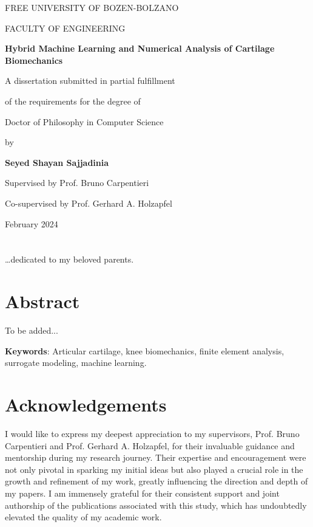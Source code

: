 \documentclass[12pt,a4paper]{report}
\begin{document}
\begin{titlepage}
    \centering
    \vspace*{1.5cm}
    \textsc{FREE UNIVERSITY OF BOZEN-BOLZANO}\par
    \textsc{FACULTY OF ENGINEERING}\par
    \vspace{2.5cm}
    {\LARGE\bfseries Hybrid Machine Learning and Numerical Analysis of Cartilage Biomechanics\par}
    \vspace{2cm}
    A dissertation submitted in partial fulfillment\par
    of the requirements for the degree of\par
    \vspace{0.5cm}
    {\Large Doctor of Philosophy in Computer Science\par}
    \vspace{2.5cm}
    by\par
    \vspace{0.5cm}
    {\Large \textbf{Seyed Shayan Sajjadinia}\par}
    \vspace{3cm}
    Supervised by Prof. Bruno Carpentieri\par
    Co-supervised by Prof. Gerhard A. Holzapfel\par
    \vspace{1.5cm}
    February 2024
\end{titlepage}

\thispagestyle{empty}
\mbox{}
\clearpage


\chapter*{}
\ldots dedicated to my beloved parents.


\chapter*{Abstract}
To be added...

\noindent
\textbf{Keywords}: Articular cartilage, knee biomechanics, finite element analysis, surrogate modeling, machine learning.
\acresetall


\chapter*{Acknowledgements}
%
I would like to express my deepest appreciation to my supervisors, Prof. Bruno Carpentieri and Prof. Gerhard A. Holzapfel, for their invaluable guidance and mentorship during my research journey. Their expertise and encouragement were not only pivotal in sparking my initial ideas but also played a crucial role in the growth and refinement of my work, greatly influencing the direction and depth of my papers. I am immensely grateful for their consistent support and joint authorship of the publications associated with this study, which has undoubtedly elevated the quality of my academic work.
\end{document}
